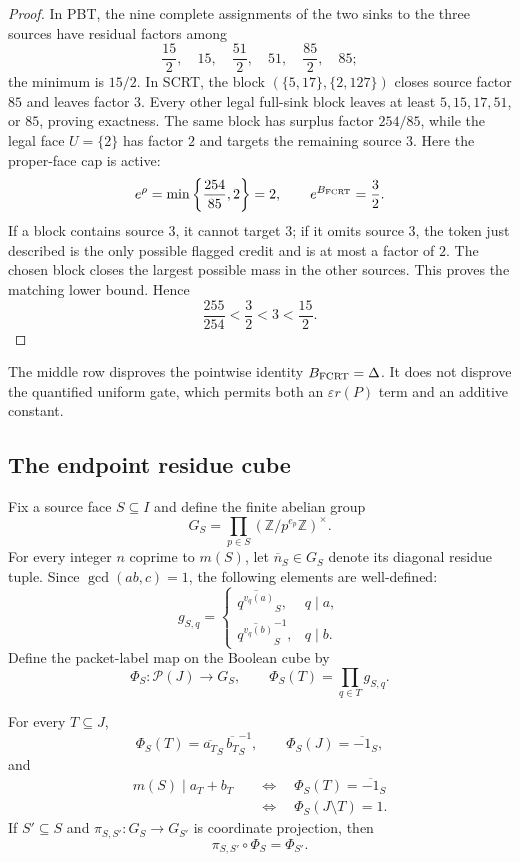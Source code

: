 \begin{proof}
In PBT, the nine complete assignments of the two sinks to the three sources
have residual factors among
\[
 \frac{15}{2},\quad15,\quad\frac{51}{2},\quad51,
 \quad\frac{85}{2},\quad85;
\]
the minimum is $15/2$.  In SCRT, the block
$(\{5,17\},\{2,127\})$ closes source factor $85$ and leaves factor $3$.
Every other legal full-sink block leaves at least
$5,15,17,51$, or $85$, proving exactness.  The same block has surplus factor
$254/85$, while the legal face $U=\{2\}$ has factor $2$ and targets the
remaining source $3$.  Here the proper-face cap is active:
\[
 e^\rho=\min\left\{\frac{254}{85},2\right\}=2,
 \qquad e^{B_{\rm FCRT}}=\frac32.
\]
If a block contains source $3$, it cannot target $3$; if it omits source
$3$, the token just described is the only possible flagged credit and is at
most a factor of $2$.  The chosen block closes the largest possible mass in
the other sources.  This proves the matching lower bound.  Hence
\[
                         \frac{255}{254}<\frac32<3<\frac{15}{2}.
\]
\end{proof}

The middle row disproves the pointwise identity
$B_{\rm FCRT}=\Delta$.  It does not disprove the quantified uniform gate,
which permits both an $\varepsilon r(P)$ term and an additive constant.

\subsection{The endpoint residue cube}

Fix a source face $S\subseteq I$ and define the finite abelian group
\[
                   G_S=\prod_{p\in S}
                   (\mathbb Z/p^{e_p}\mathbb Z)^\times.
\tag{FCRT-20}\label{eq:fcrt-residue-group}
\]
For every integer $n$ coprime to $m(S)$, let $\overline n_S\in G_S$ denote
its diagonal residue tuple.  Since $\gcd(ab,c)=1$, the following elements are
well-defined:
\[
 g_{S,q}=
 \begin{cases}
  \overline{q^{v_q(a)}}_S,&q\mid a,\\
  \overline{q^{v_q(b)}}_S^{-1},&q\mid b.
 \end{cases}
\tag{FCRT-21}\label{eq:fcrt-residue-generators}
\]
Define the packet-label map on the Boolean cube by
\[
 \Phi_S:\mathcal P(J)\longrightarrow G_S,
 \qquad \Phi_S(T)=\prod_{q\in T}g_{S,q}.
\tag{FCRT-22}\label{eq:fcrt-packet-label}
\]

\begin{proposition}
\label{prop:fcrt-fixed-fibre}
For every $T\subseteq J$,
\[
 \Phi_S(T)=\overline{a_T}_S\,\overline{b_T}_S^{-1},
 \qquad \Phi_S(J)=\overline{-1}_S,
\tag{FCRT-23}\label{eq:fcrt-full-label}
\]
and
\[
 \begin{split}
 m(S)\mid a_T+b_T
 &\quad\Longleftrightarrow\quad
 \Phi_S(T)=\overline{-1}_S\\
 &\quad\Longleftrightarrow\quad
 \Phi_S(J\setminus T)=1.
 \end{split}
\tag{FCRT-24}\label{eq:fcrt-complement-fibre}
\]
If $S'\subseteq S$ and
$\pi_{S,S'}:G_S\to G_{S'}$ is coordinate projection, then
\[
                         \pi_{S,S'}\circ\Phi_S=\Phi_{S'}.
\tag{FCRT-25}\label{eq:fcrt-inverse-system}
\]
\end{proposition}

